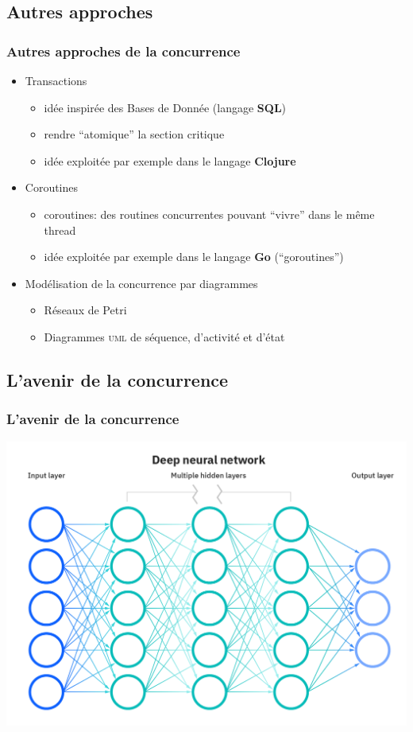 \documentclass{beamer}
\begin{document}
\subsection{Autres approches}
\begin{frame}
  \frametitle{Autres approches de la concurrence}
  \begin{itemize}
  
  \item<1->Transactions
  \begin{itemize}
  \item idée inspirée des Bases de Donnée (langage \textbf{SQL})
  \item rendre ``atomique'' la section critique
  \item idée exploitée par exemple dans le langage \textbf{Clojure}
  \end{itemize}
  
  \item<2->Coroutines
  \begin{itemize}
  \item coroutines: des routines concurrentes pouvant ``vivre'' dans le même thread
  \item idée exploitée par exemple dans le langage \textbf{Go} (``goroutines'')
  \end{itemize}

\item<3->Modélisation de la concurrence par diagrammes
  \begin{itemize}
  \item Réseaux de Petri
  \item Diagrammes \textsc{uml} de séquence, d'activité et d'état
  \end{itemize}
  
  \end{itemize}
\end{frame}
\subsection{L'avenir de la concurrence}
\begin{frame}
  \frametitle{L'avenir de la concurrence}
  \begin{center}
    \includegraphics[width=.9\textwidth]{reseaux-neurones.png}
  \end{center}
\end{frame}
\end{document}
